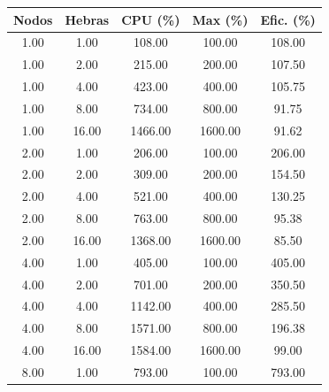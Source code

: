 \begin{table}[ht]
    \centering
    \begin{tabular}{|c|c|c|c|c|}
        \hline
        \textbf{Nodos} & \textbf{Hebras} & \textbf{CPU (\%)} & \textbf{Max (\%)} & \textbf{Efic. (\%)} \\
        \hline
        1.00           & 1.00            & 108.00            & 100.00            & 108.00              \\
        1.00           & 2.00            & 215.00            & 200.00            & 107.50              \\
        1.00           & 4.00            & 423.00            & 400.00            & 105.75              \\
        1.00           & 8.00            & 734.00            & 800.00            & 91.75               \\
        1.00           & 16.00           & 1466.00           & 1600.00           & 91.62               \\
        2.00           & 1.00            & 206.00            & 100.00            & 206.00              \\
        2.00           & 2.00            & 309.00            & 200.00            & 154.50              \\
        2.00           & 4.00            & 521.00            & 400.00            & 130.25              \\
        2.00           & 8.00            & 763.00            & 800.00            & 95.38               \\
        2.00           & 16.00           & 1368.00           & 1600.00           & 85.50               \\
        4.00           & 1.00            & 405.00            & 100.00            & 405.00              \\
        4.00           & 2.00            & 701.00            & 200.00            & 350.50              \\
        4.00           & 4.00            & 1142.00           & 400.00            & 285.50              \\
        4.00           & 8.00            & 1571.00           & 800.00            & 196.38              \\
        4.00           & 16.00           & 1584.00           & 1600.00           & 99.00               \\
        8.00           & 1.00            & 793.00            & 100.00            & 793.00              \\

\end{tabular}
\end{table}
